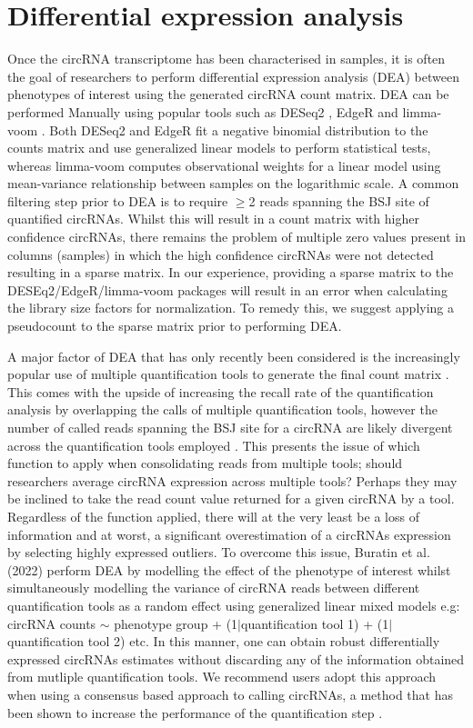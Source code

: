 \documentclass[journal,review,submit,pdftex,moreauthors]{Definitions/mdpi}
\begin{document}
\section{Differential expression analysis}
Once the circRNA transcriptome has been characterised in samples, it is often the goal of researchers to perform differential expression analysis (DEA) between phenotypes of interest using the generated circRNA count matrix. DEA can be performed Manually using popular tools such as DESeq2 \cite{Love2014Dec}, EdgeR \cite{Robinson2010Jan} and limma-voom \cite{Law2014Feb}. Both DESeq2 and EdgeR fit a negative binomial distribution to the counts matrix and use generalized linear models to perform statistical tests, whereas limma-voom computes observational weights for a linear model using mean-variance relationship between samples on the logarithmic scale. A common filtering step prior to DEA is to require $\geq$2 reads spanning the BSJ site of quantified circRNAs. Whilst this will result in a count matrix with higher confidence circRNAs, there remains the problem of multiple zero values present in columns (samples) in which the high confidence circRNAs were not detected resulting in a sparse matrix. In our experience, providing a sparse matrix to the DESEq2/EdgeR/limma-voom packages will result in an error when calculating the library size factors for normalization. To remedy this, we suggest applying a pseudocount to the sparse matrix prior to performing DEA. \par
A major factor of DEA that has only recently been considered is the increasingly popular use of multiple quantification tools to generate the final count matrix \cite{Hansen2018, CirComPara2, Digby2023Dec}. This comes with the upside of increasing the recall rate of the quantification analysis by overlapping the calls of multiple quantification tools, however the number of called reads spanning the BSJ site for a circRNA are likely divergent across the quantification tools employed \cite{Hansen2016Apr,Hansen2018}. This presents the issue of which function to apply when consolidating reads from multiple tools; should researchers average circRNA expression across multiple tools? Perhaps they may be inclined to take the read count value returned for a given circRNA by a tool. Regardless of the function applied, there will at the very least be a loss of information and at worst, a significant overestimation of a circRNAs expression by selecting highly expressed outliers. To overcome this issue, Buratin et al. (2022) \cite{Buratin2022} perform DEA by modelling the effect of the phenotype of interest whilst simultaneously modelling the variance of circRNA reads between different quantification tools as a random effect using generalized linear mixed models e.g: circRNA counts $\sim$ phenotype group + (1$\vert$quantification tool 1) + (1$\vert$quantification tool 2) etc. In this manner, one can obtain robust differentially expressed circRNAs estimates without discarding any of the information obtained from mutliple quantification tools. We recommend users adopt this approach when using a consensus based approach to calling circRNAs, a method that has been shown to increase the performance of the quantification step \cite{Hansen2018}. \par
\end{document}
